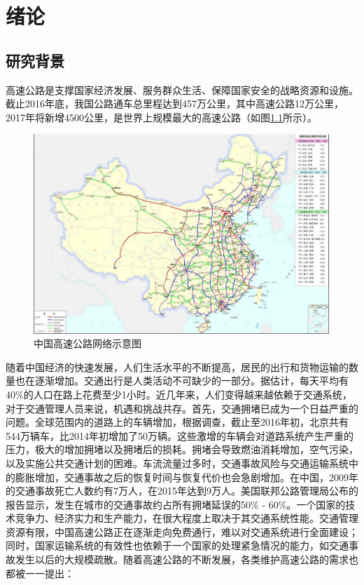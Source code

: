 
\chapter{绪论}
\section{研究背景}

高速公路是支撑国家经济发展、服务群众生活、保障国家安全的战略资源和设施。截止2016年底，我国公路通车总里程达到457万公里，其中高速公路12万公里，2017年将新增4500公里，是世界上规模最大的高速公路（如图\ref{gaosugonglu}所示）。 

				\begin{figure}[h]
				\centering
						\begin{minipage}{0.8\linewidth}
							\centering
							\includegraphics[width=4.4in]{picture/gaosugonglu}
							\caption{中国高速公路网络示意图}
							\label{gaosugonglu}
						\end{minipage}%
				\end{figure}

随着中国经济的快速发展，人们生活水平的不断提高，居民的出行和货物运输的数量也在逐渐增加。交通出行是人类活动不可缺少的一部分。据估计，每天平均有40\%的人口在路上花费至少1小时。近几年来，人们变得越来越依赖于交通系统，对于交通管理人员来说，机遇和挑战共存。首先，交通拥堵已成为一个日益严重的问题。全球范围内的道路上的车辆增加，根据调查，截止至2016年初，北京共有544万辆车，比2014年初增加了50万辆。这些激增的车辆会对道路系统产生严重的压力，极大的增加拥堵以及拥堵后的损耗。拥堵会导致燃油消耗增加，空气污染，以及实施公共交通计划的困难。车流流量过多时，交通事故风险与交通运输系统中的膨胀增加，交通事故之后的恢复时间与恢复代价也会急剧增加。在中国，2009年的交通事故死亡人数约有7万人，在2015年达到9万人。美国联邦公路管理局公布的报告显示，发生在城市的交通事故约占所有拥堵延误的50\% - 60\%。一个国家的技术竞争力、经济实力和生产能力，在很大程度上取决于其交通系统性能。交通管理资源有限，中国高速公路正在逐渐走向免费通行，难以对交通系统进行全面建设；同时，国家运输系统的有效性也依赖于一个国家的处理紧急情况的能力，如交通事故发生以后的大规模疏散。随着高速公路的不断发展，各类维护高速公路的需求也都被一一提出：

